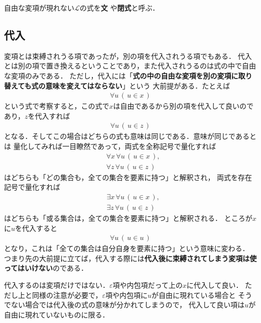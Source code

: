 	\begin{screen}
		\begin{metadfn}[文]
			自由な変項が現れない$\mathcal{L}$の式を{\bf 文}
			や{\bf 閉式}と呼ぶ．
		\end{metadfn}
	\end{screen}
	
\subsection{代入}
	変項とは束縛されうる項であったが，別の項を代入されうる項でもある．
	代入とは別の項で置き換えるということであり，また代入されうるのは式の中で自由な変項のみである．
	ただし，代入には「{\bf 式の中の自由な変項を別の変項に取り替えても式の意味を変えてはならない}」という
	大前提がある．たとえば
	\begin{align}
		\forall u\, (\, u \in x\, )
	\end{align}
	という式で考察すると，この式で$x$は自由であるから別の項を代入して良いのであり，$z$を代入すれば
	\begin{align}
		\forall u\, (\, u \in z\, )
	\end{align}
	となる．そしてこの場合はどちらの式も意味は同じである．意味が同じであるとは
	量化してみれば一目瞭然であって，両式を全称記号で量化すれば
	\begin{align}
		&\forall x\, \forall u\, (\, u \in x\, ), \\
		&\forall z\, \forall u\, (\, u \in z\, )
	\end{align}
	はどちらも「どの集合も，全ての集合を要素に持つ」と解釈され，
	両式を存在記号で量化すれば
	\begin{align}
		&\exists x\, \forall u\, (\, u \in x\, ), \\
		&\exists z\, \forall u\, (\, u \in z\, )
	\end{align}
	はどちらも「或る集合は，全ての集合を要素に持つ」と解釈される．
	ところが$x$に$u$を代入すると
	\begin{align}
		\forall u\, (\, u \in u\, )
	\end{align}
	となり，これは「全ての集合は自分自身を要素に持つ」という意味に変わる．
	つまり先の大前提に立てば，代入する際には{\bf 代入後に束縛されてしまう変項は使ってはいけない}のである．
	
	代入するのは変項だけではない．$\varepsilon$項や内包項だって上の$x$に代入して良い．
	ただし上と同様の注意が必要で，$\varepsilon$項や内包項に$u$が自由に現れている場合と
	そうでない場合では代入後の式の意味が分かれてしまうので，
	代入して良い項は$u$が自由に現れていないものに限る．
	
